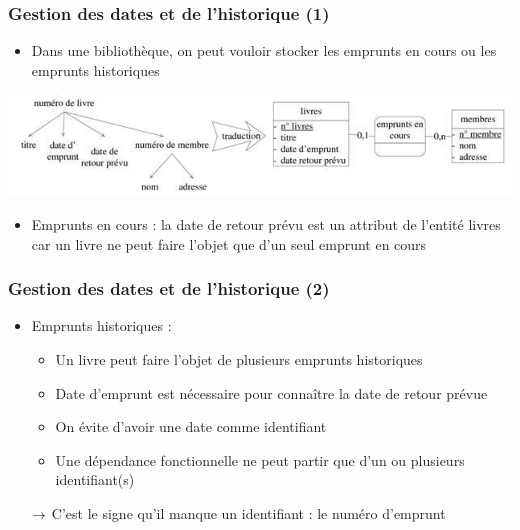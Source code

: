 \begin{frame}
  \frametitle{Gestion des dates et de l'historique (1)}
  \begin{itemize}
    \item Dans une bibliothèque, on peut vouloir stocker les emprunts en cours ou les emprunts historiques
  \end{itemize}
  \begin{center}
    \includegraphics[width=0.9\linewidth]{emprunts_en_cours.jpg}
  \end{center}
  \begin{itemize}
    \item Emprunts en cours : la date de retour prévu est un attribut de l'entité livres car un livre
      ne peut faire l'objet que d'un seul emprunt en cours
  \end{itemize}
\end{frame}

\begin{frame}
  \frametitle{Gestion des dates et de l'historique (2)}
  \begin{itemize}
    \item Emprunts historiques :
      \begin{itemize}
        \item Un livre peut faire l'objet de plusieurs emprunts historiques
        \item Date d'emprunt est nécessaire pour connaître la date de retour prévue
        \item On évite d'avoir une date comme identifiant
        \item Une dépendance fonctionnelle ne peut partir que d'un ou plusieurs identifiant(s)
      \end{itemize}
    \item[$\rightarrow$] C'est le signe qu'il manque un identifiant : le numéro d'emprunt
  \end{itemize}
\end{frame}

